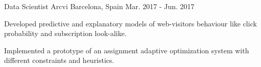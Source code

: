 
\begin{cventries}

\cventry
  {Data Scientist}
  {Arcvi}
  {Barcelona, Spain}
  {Mar. 2017 - Jun. 2017}
  {
    \begin{cvitems}
      \item {Developed predictive and explanatory models of web-visitors behaviour like click probability and subscription look-alike.}
      \item {Implemented a prototype of an assignment adaptive optimization system with different constraints and heuristics.}
    \end{cvitems}
  }

\end{cventries}
